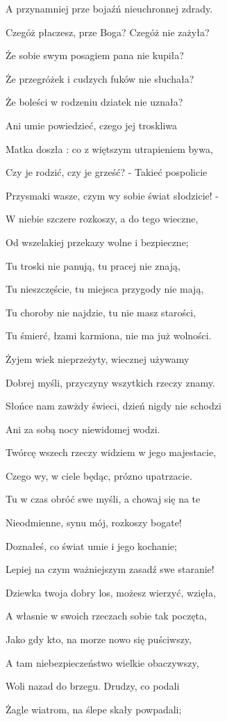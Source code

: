 \documentclass{article}
\begin{document}
A przynamniej prze bojaźń nieuchronnej zdrady.

Czegóż płaczesz, prze Boga? Czegóż nie zażyła?

Że sobie swym posagiem pana nie kupiła?

Że przegróżek i cudzych fuków nie słuchała?

Że boleści w rodzeniu dziatek nie uznała?

Ani umie powiedzieć, czego jej troskliwa

Matka doszła : co z więtszym utrapieniem bywa,

Czy je rodzić, czy je grześć? - Takieć pospolicie

Przysmaki wasze, czym wy sobie świat słodzicie! -

W niebie szczere rozkoszy, a do tego wieczne,

Od wszelakiej przekazy wolne i bezpieczne;

Tu troski nie panują, tu pracej nie znają,

Tu nieszczęście, tu miejsca przygody nie mają,

Tu choroby nie najdzie, tu nie masz starości,

Tu śmierć, łzami karmiona, nie ma już wolności.

Żyjem wiek nieprzeżyty, wiecznej używamy

Dobrej myśli, przyczyny wszytkich rzeczy znamy.

Słońce nam zawżdy świeci, dzień nigdy nie schodzi

Ani za sobą nocy niewidomej wodzi.

Twórcę wszech rzeczy widziem w jego majestacie,

Czego wy, w ciele będąc, prózno upatrzacie.

Tu w czas obróć swe myśli, a chowaj się na te

Nieodmienne, synu mój, rozkoszy bogate!

Doznałeś, co świat umie i jego kochanie;

Lepiej na czym ważniejszym zasadź swe staranie!

Dziewka twoja dobry los, możesz wierzyć, wzięła,

A własnie w swoich rzeczach sobie tak poczęta,

Jako gdy kto, na morze nowo się puściwszy,

A tam niebezpieczeństwo wielkie obaczywszy,

Woli nazad do brzegu. Drudzy, co podali

Żagle wiatrom, na ślepe skały powpadali;
\end{document}
